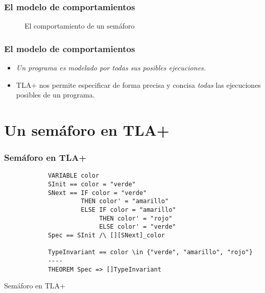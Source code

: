 \documentclass{beamer}
\begin{document}
\begin{frame}
  \frametitle{El modelo de comportamientos}

  \begin{figure}[h]
      \centering
      
      \caption{El comportamiento de un semáforo}
      \label{fig:sem}
  \end{figure}

\end{frame}

\begin{frame}
  \frametitle{El modelo de comportamientos}

  \begin{itemize}
    \item \emph{Un programa es modelado por todas sus posibles ejecuciones.}
    \item TLA+ nos permite especificar de forma precisa y concisa \emph{todas} las ejecuciones posibles de un programa.
  \end{itemize}
\end{frame}

\section{Un semáforo en TLA+}

\begin{frame}[fragile]
  \frametitle{Semáforo en TLA+}

  \begin{listing}[H]
    \begin{center}
      \begin{minipage}{0.7\textwidth}
        \begin{verbatim}
            VARIABLE color
            SInit == color = "verde"
            SNext == IF color = "verde"
                     THEN color' = "amarillo"
                     ELSE IF color = "amarillo"
                          THEN color' = "rojo"
                          ELSE color' = "verde"
            Spec == SInit /\ [][SNext]_color

            TypeInvariant == color \in {"verde", "amarillo", "rojo"}
            ----
            THEOREM Spec => []TypeInvariant
        \end{verbatim}
      \end{minipage}
    \end{center}
    \caption{Semáforo en TLA+}
    \label{lst:sem_tla}
  \end{listing}
\end{frame}
\end{document}
